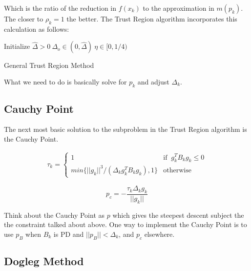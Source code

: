 \documentclass[12pt]{article}
\begin{document}
\vspace{5mm}

Which is the ratio of the reduction in $f(x_k)$ to the approximation in $m(p_k)$. The closer to $\rho_k=1$ the better. The Trust Region algorithm incorporates this calculation as follows:

\vspace{5mm}

\begin{algorithm}[H]
Initialize $\hat{\Delta}>0 \: \Delta_o \in (0,\hat{\Delta}) \: \eta \in [0,1/4)$ \;
\caption{General Trust Region Method}
\end{algorithm}

\vspace{5mm}

What we need to do is basically solve for $p_k$ and adjust $\Delta_k$.

\subsection{Cauchy Point}

The next most basic solution to the subproblem in the Trust Region algorithm is the Cauchy Point. 

\begin{align*}
\tau_k=
\begin{cases}
    1 & \text{if } \: g_k^T B_k g_k \leq 0\\
    min\{||g_k||^3/(\Delta_k g^T_k B_k g_k),1\} & \text{otherwise}
\end{cases}
\end{align*}

\begin{equation}
p_c=-\dfrac{\tau_k \Delta_k g_k}{||g_k||}
\end{equation}

Think about the Cauchy Point as $p$ which gives the steepest descent subject the the constraint talked about above. One way to implement the Cauchy Point is to use $p_B$ when $B_k$ is PD and $||p_B||<\Delta_k$, and $p_c$ elsewhere.

\subsection{Dogleg Method}
\end{document}

